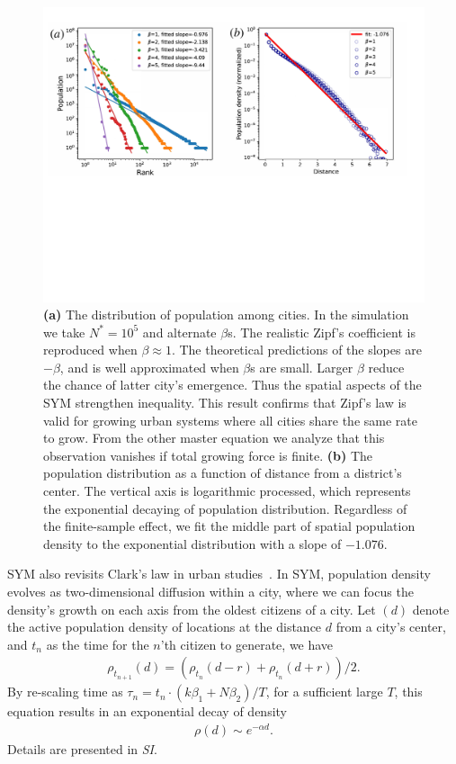 \documentclass[reprint,unsortedaddress,amsmath,amssymb,aps,prl,showkeys]{revtex4-2}
\begin{document}
\begin{figure}[t]
	\centering
	\includegraphics[width = .99\linewidth]{pics/zipf_clark.pdf}
	\caption{\textbf{(a)} The distribution of population among cities. In the simulation we take $N^* = 10^5$ and alternate $\beta$s. The realistic Zipf's coefficient is reproduced when $\beta\approx 1$. The theoretical predictions of the slopes are $-\beta$, and is well approximated when $\beta$s are small. Larger $\beta$ reduce the chance of latter city's emergence. Thus the spatial aspects of the SYM strengthen inequality. This result confirms that Zipf's law is valid for growing urban systems where all cities share the same rate to grow. From the other master equation we analyze that this observation vanishes if total growing force is finite. \textbf{(b)} The population distribution as a function of distance from a district's center. The vertical axis is logarithmic processed, which represents the exponential decaying of population distribution. Regardless of the finite-sample effect, we fit the middle part of spatial population density to the exponential distribution with a slope of $-1.076$.}
	\label{Fig2}
\end{figure}

SYM also revisits Clark's law in urban studies~\cite{clark1951urban}. In SYM, population density evolves as two-dimensional diffusion within a city\cite{doi:10.1137/0150099}, where we can focus the density's growth on each axis from the oldest citizens of a city. Let $
(d)$ denote the active population density of locations at the distance $d$ from a city's center, and $t_n$ as the time for the $n$'th citizen to generate, we have 
\begin{align}
	\rho_{t_{n+1}}(d) = (\rho_{t_{n}}(d-r) + \rho_{t_{n}}(d+r) )/2.\label{loc_den}  
\end{align} By re-scaling time as $\tau_n = t_n\cdot (k\beta_1+N\beta_2)/T$, for a sufficient large $T$, this equation results in an exponential decay of density
\begin{align}
	\rho(d)\sim e^{-\alpha d}\label{clark_eq}.
\end{align} Details are presented in \textit{SI}. 
\end{document}
